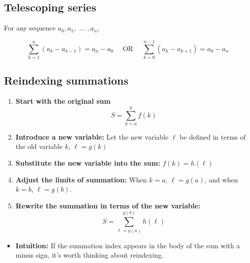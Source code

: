 \documentclass{article}
\begin{document}
    \subsection{Telescoping series}
        \begin{definition}
            For any sequence $a_0, a_1, \text{ ... }, a_n$,

            \begin{equation}
                \sum_{k=1}^{n} (a_k - a_{k-1}) = a_n - a_0 \quad \text{ OR } \quad \sum_{k=0}^{n-1} (a_k - a_{k+1}) = a_0 - a_n
            \end{equation}
        \end{definition}

    \subsection{Reindexing summations}
        \begin{process}
            \begin{enumerate}
                \item \textbf{Start with the original sum}
                \[
                S = \sum_{k=a}^{b} f(k)
                \]

                \item \textbf{Introduce a new variable:} Let the new variable $\ell$ be defined in terms of the old variable $k$, $\ell = g(k)$

                \item \textbf{Substitute the new variable into the sum:} $f(k) = h(\ell)$

                \item \textbf{Adjust the limits of summation:} When $k = a$, $\ell = g(a)$, and when $k = b$, $\ell = g(b)$.

                \item \textbf{Rewrite the summation in terms of the new variable:}
                \[
                S = \sum_{\ell = g(a)}^{g(b)} h(\ell)
                \]
            \end{enumerate}

            \begin{itemize}
                \item \textbf{Intuition:} If the summation index appears in the body of the sum with a minus sign, it's worth thinking about reindexing.
            \end{itemize}
        \end{process}
\newpage
\end{document}
